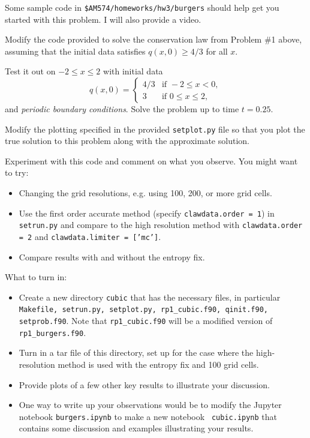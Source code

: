 \documentclass[11pt]{article}
\begin{document}
Some sample code in \verb+$AM574/homeworks/hw3/burgers+ should help
get you started with this problem.  I will also provide a video.

Modify the code provided to solve the conservation law from Problem \#1
above, assuming that the initial data satisfies $q(x,0) \geq 4/3$ for all
$x$.

Test it out on $-2 \leq x \leq 2$  with initial data
\[
q(x,0) = \begin{cases} 
        4/3 &\text{if~}-2\leq x<0,\\ 
        3 &\text{if~}0\leq x\leq 2,
         \end{cases}
\]
and {\em periodic boundary conditions}.   
Solve the problem up to time $t=0.25$.

Modify the plotting specified in the provided {\tt setplot.py} file so that
you plot the true solution to this problem along with the approximate
solution.


\vskip 5pt
Experiment with this code and comment on what you observe.  You might want
to try:

\begin{itemize}
\item Changing the grid resolutions, e.g. using 100, 200, or more grid cells.

\item Use the first order accurate method (specify {\tt clawdata.order = 1})
in {\tt setrun.py} and compare to the high resolution 
method with {\tt clawdata.order = 2} and {\tt clawdata.limiter = ['mc']}.

\item Compare results with and without the entropy fix.

\end{itemize} 

What to turn in:
\begin{itemize}
\item Create a new directory \verb+cubic+ that has the necessary files, in
particular {\tt Makefile, setrun.py, setplot.py, rp1\_cubic.f90, qinit.f90,
setprob.f90}.  Note that {\tt rp1\_cubic.f90} will be a modified version of
{\tt rp1\_burgers.f90}.  
\item Turn in a tar file of this directory, set up for the case where the
high-resolution method is used with the entropy fix and 100 grid cells.
\item Provide plots of a few other key results to illustrate your
discussion.
\item One way to write up your observations would be to
modify the Jupyter notebook {\tt burgers.ipynb} to make a new notebook {\tt
cubic.ipynb} that contains some discussion and examples illustrating 
your results.
\end{itemize} 
\end{document}
